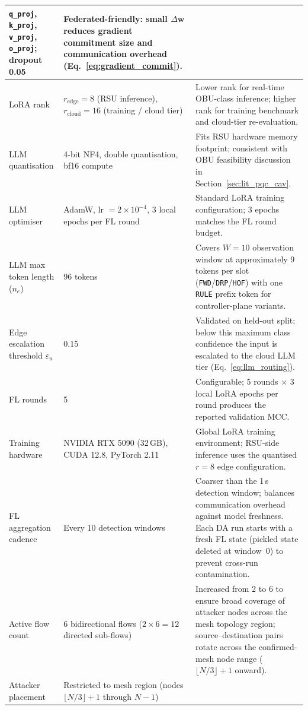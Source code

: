 \documentclass[12pt, a4paper]{report}
\begin{document}
{\begin{longtable}{| p{3.0cm} | p{4.3cm} | p{6.0cm} |}
\texttt{q\_proj}, \texttt{k\_proj}, \texttt{v\_proj},
\texttt{o\_proj}; dropout 0.05 &
Federated-friendly: small $\Delta\mathbf{w}$ reduces gradient
commitment size and communication overhead
(Eq.~\eqref{eq:gradient_commit}). \\
\hline
LoRA rank & $r_{\text{edge}}=8$ (RSU inference),
$r_{\text{cloud}}=16$ (training / cloud tier) &
Lower rank for real-time OBU-class inference; higher rank for
training benchmark and cloud-tier re-evaluation. \\
\hline
LLM quantisation & 4-bit NF4, double quantisation, bf16 compute &
Fits RSU hardware memory footprint; consistent with OBU feasibility
discussion in Section~\ref{sec:lit_pqc_cav}. \\
\hline
LLM optimiser & AdamW, lr $= 2\times10^{-4}$, 3 local epochs
per FL round &
Standard LoRA training configuration; 3 epochs matches the FL
round budget. \\
\hline
LLM max token length ($n_e$) & 96 tokens &
Covers $W=10$ observation window at approximately 9 tokens per slot
(\texttt{FWD}/\texttt{DRP}/\texttt{HOF}) with one
\texttt{RULE} prefix token for controller-plane variants. \\
\hline
Edge escalation threshold $\varepsilon_u$ & 0.15 &
Validated on held-out split; below this maximum class confidence
the input is escalated to the cloud LLM tier
(Eq.~\eqref{eq:llm_routing}). \\
\hline
FL rounds & 5 &
Configurable; 5 rounds $\times$ 3 local LoRA epochs per round
produces the reported validation MCC. \\
\hline
Training hardware & NVIDIA RTX 5090 (32\,GB), CUDA 12.8,
PyTorch 2.11 &
Global LoRA training environment; RSU-side inference uses the
quantised $r=8$ edge configuration. \\
\hline
FL aggregation cadence & Every 10 detection windows &
Coarser than the 1\,s detection window; balances communication
overhead against model freshness. Each DA run starts with a
fresh FL state (pickled state deleted at window~0) to prevent
cross-run contamination. \\
\hline
Active flow count & 6 bidirectional flows ($2 \times 6 = 12$
directed sub-flows) &
Increased from 2 to 6 to ensure broad coverage of attacker
nodes across the mesh topology region; source--destination
pairs rotate across the confirmed-mesh node range
($\lfloor N/3\rfloor + 1$ onward). \\
\hline
Attacker placement & Restricted to mesh region
(nodes $\lfloor N/3\rfloor + 1$ through $N-1$) &

\end{longtable}}
\end{document}
